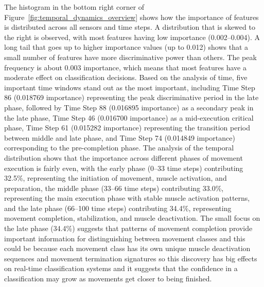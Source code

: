 \documentclass{elektr}
\begin{document}
The histogram in the bottom right corner of Figure~\ref{fig:temporal_dynamics_overview} shows how the importance of features is distributed across all sensors and time steps. A distribution that is skewed to the right is observed, with most features having low importance (0.002–0.004). A long tail that goes up to higher importance values (up to 0.012) shows that a small number of features have more discriminative power than others. The peak frequency is about 0.003 importance, which means that most features have a moderate effect on classification decisions. Based on the analysis of time, five important time windows stand out as the most important, including Time Step 86 (0.018769 importance) representing the peak discriminative period in the late phase, followed by Time Step 88 (0.016895 importance) as a secondary peak in the late phase, Time Step 46 (0.016700 importance) as a mid-execution critical phase, Time Step 61 (0.015282 importance) representing the transition period between middle and late phase, and Time Step 74 (0.014849 importance) corresponding to the pre-completion phase.
 The analysis of the temporal distribution shows that the importance across different phases of movement execution is fairly even, with the early phase (0–33 time steps) contributing 32.5\%, representing the initiation of movement, muscle activation, and preparation, the middle phase (33–66 time steps) contributing 33.0\%, representing the main execution phase with stable muscle activation patterns, and the late phase (66–100 time steps) contributing 34.4\%, representing movement completion, stabilization, and muscle deactivation.
The small focus on the late phase (34.4\%) suggests that patterns of movement completion provide important information for distinguishing between movement classes and this could be because each movement class has its own unique muscle deactivation sequences and movement termination signatures so this discovery has big effects on real-time classification systems and it suggests that the confidence in a classification may grow as movements get closer to being finished.
\end{document}
